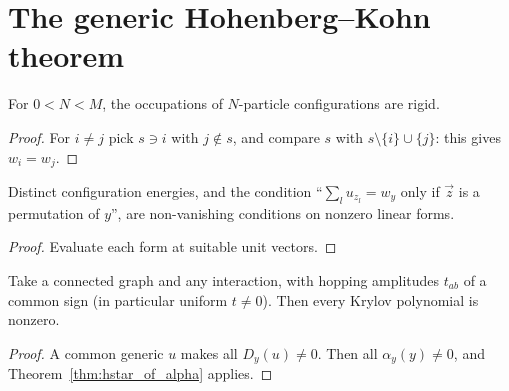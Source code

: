 \chapter{The generic Hohenberg--Kohn theorem}
\label{chap:main}

\begin{theorem}
  \label{thm:rigid_occF}
  \leanok
  For $0<N<M$, the occupations of $N$-particle configurations are rigid.
\end{theorem}
\begin{proof}
  \leanok
  For $i\ne j$ pick $s\ni i$ with $j\notin s$, and compare $s$ with $s\setminus\{i\}\cup\{j\}$: this gives
  $w_i=w_j$.
\end{proof}

\begin{lemma}
  \label{lem:forms}
  \leanok
  Distinct configuration energies, and the condition ``$\sum_lu_{z_l}=w_y$ only if $\vec z$ is a permutation
  of $y$'', are non-vanishing conditions on nonzero linear forms.
\end{lemma}
\begin{proof}
  \leanok
  Evaluate each form at suitable unit vectors.
\end{proof}

\begin{theorem}
  \label{thm:hstar_lattice_fermions}
  \leanok
  Take a connected graph and any interaction, with hopping amplitudes $t_{ab}$ of a common sign (in
  particular uniform $t\ne0$). Then every Krylov polynomial is nonzero.
\end{theorem}
\begin{proof}
  \leanok
  A common generic $u$ makes all $D_y(u)\ne0$. Then all $\alpha_y(y)\ne0$, and
  Theorem~\ref{thm:hstar_of_alpha} applies.
\end{proof}

